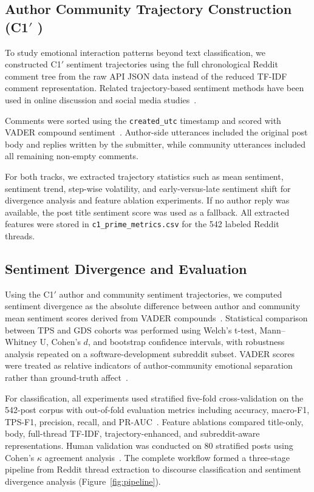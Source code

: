 \documentclass[conference]{IEEEtran}
\begin{document}
\subsection{Author Community Trajectory Construction (C1$'$ )}
\label{subsec:method-c1}

To study emotional interaction patterns beyond text classification, we constructed C1$'$ sentiment trajectories using the full chronological Reddit comment tree from the raw API JSON data instead of the reduced TF-IDF comment representation. Related trajectory-based sentiment methods have been used in online discussion and social media studies~\cite{wen2014sentiment,hutto2014}.

Comments were sorted using the \texttt{created\_utc} timestamp and scored with VADER compound sentiment~\cite{hutto2014}. Author-side utterances included the original post body and replies written by the submitter, while community utterances included all remaining non-empty comments.

For both tracks, we extracted trajectory statistics such as mean sentiment, sentiment trend, step-wise volatility, and early-versus-late sentiment shift for divergence analysis and feature ablation experiments. If no author reply was available, the post title sentiment score was used as a fallback. All extracted features were stored in \texttt{c1\_prime\_metrics.csv} for the 542 labeled Reddit threads.

\subsection{Sentiment Divergence and Evaluation}
\label{subsec:divergence-eval}

Using the C1$'$ author and community sentiment trajectories, we computed sentiment divergence as the absolute difference between author and community mean sentiment scores derived from VADER compounds~\cite{hutto2014}. Statistical comparison between TPS and GDS cohorts was performed using Welch’s t-test, Mann--Whitney U, Cohen’s $d$, and bootstrap confidence intervals, with robustness analysis repeated on a software-development subreddit subset. VADER scores were treated as relative indicators of author-community emotional separation rather than ground-truth affect~\cite{wen2014sentiment}. 

For classification, all experiments used stratified five-fold cross-validation on the 542-post corpus with out-of-fold evaluation metrics including accuracy, macro-F1, TPS-F1, precision, recall, and PR-AUC~\cite{prusty2022skcv}. Feature ablations compared title-only, body, full-thread TF-IDF, trajectory-enhanced, and subreddit-aware representations. Human validation was conducted on 80 stratified posts using Cohen’s $\kappa$ agreement analysis~\cite{wang2019simplified}. The complete workflow formed a three-stage pipeline from Reddit thread extraction to discourse classification and sentiment divergence analysis (Figure~\ref{fig:pipeline}).
\end{document}
